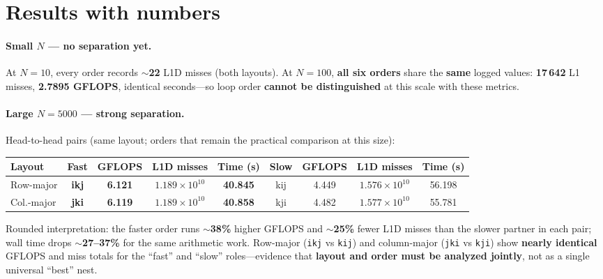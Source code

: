 \documentclass[11pt]{article}
\begin{document}
\section*{Results with numbers}

\paragraph{Small $N$ --- no separation yet.}
At \textbf{$N=10$}, every order records \textbf{$\sim$22} L1D misses (both layouts). At \textbf{$N=100$}, \textbf{all six orders} share the \textbf{same} logged values: \textbf{17\,642} L1 misses, \textbf{2.7895 GFLOPS}, identical seconds---so loop order \textbf{cannot be distinguished} at this scale with these metrics.

\paragraph{Large $N=5000$ --- strong separation.}
Head-to-head pairs (same layout; orders that remain the practical comparison at this size):

\begin{table}[h]
\centering
\small
\setlength{\tabcolsep}{4pt}
\begin{tabular}{@{}lcccccccc@{}}
\toprule
\textbf{Layout} & \textbf{Fast} & \textbf{GFLOPS} & \textbf{L1D misses} & \textbf{Time (s)} &
\textbf{Slow} & \textbf{GFLOPS} & \textbf{L1D misses} & \textbf{Time (s)} \\
\midrule
Row-major    & \textbf{ikj} & \textbf{6.121} & \textbf{$1.189\times 10^{10}$} & \textbf{40.845} &
kij & 4.449 & $1.576\times 10^{10}$ & 56.198 \\
Col.-major & \textbf{jki} & \textbf{6.119} & \textbf{$1.189\times 10^{10}$} & \textbf{40.858} &
kji & 4.482 & $1.577\times 10^{10}$ & 55.781 \\
\bottomrule
\end{tabular}
\end{table}

\noindent Rounded interpretation: the faster order runs \textbf{$\sim$38\%} higher GFLOPS and \textbf{$\sim$25\%} fewer L1D misses than the slower partner in each pair; wall time drops \textbf{$\sim$27--37\%} for the same arithmetic work. Row-major (\texttt{ikj} vs \texttt{kij}) and column-major (\texttt{jki} vs \texttt{kji}) show \textbf{nearly identical} GFLOPS and miss totals for the ``fast'' and ``slow'' roles---evidence that \textbf{layout and order must be analyzed jointly}, not as a single universal ``best'' nest.
\end{document}
